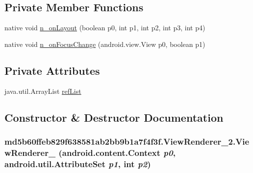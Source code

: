 \subsection*{Private Member Functions}
\begin{CompactItemize}
\item 
native void \hyperlink{classmd5b60ffeb829f638581ab2bb9b1a7f4f3f_1_1_view_renderer__2_40c528ea52e22dd29fa541de43c0a010}{n\_\-onLayout} (boolean p0, int p1, int p2, int p3, int p4)
\item 
native void \hyperlink{classmd5b60ffeb829f638581ab2bb9b1a7f4f3f_1_1_view_renderer__2_94c144057c065fa69c86c0549ec422ff}{n\_\-onFocusChange} (android.view.View p0, boolean p1)
\end{CompactItemize}
\subsection*{Private Attributes}
\begin{CompactItemize}
\item 
java.util.ArrayList \hyperlink{classmd5b60ffeb829f638581ab2bb9b1a7f4f3f_1_1_view_renderer__2_6c151401977148a92c515e9c7de1aaf8}{refList}
\end{CompactItemize}


\subsection{Constructor \& Destructor Documentation}
\hypertarget{classmd5b60ffeb829f638581ab2bb9b1a7f4f3f_1_1_view_renderer__2_a98f61b833d11b90b0f77280606f4d3a}{
\subsubsection[{ViewRenderer\_\-2}]{\setlength{\rightskip}{0pt plus 5cm}md5b60ffeb829f638581ab2bb9b1a7f4f3f.ViewRenderer\_\-2.ViewRenderer\_ (android.content.Context {\em p0}, \/  android.util.AttributeSet {\em p1}, \/  int {\em p2})}}
\label{classmd5b60ffeb829f638581ab2bb9b1a7f4f3f_1_1_view_renderer__2_a98f61b833d11b90b0f77280606f4d3a}




